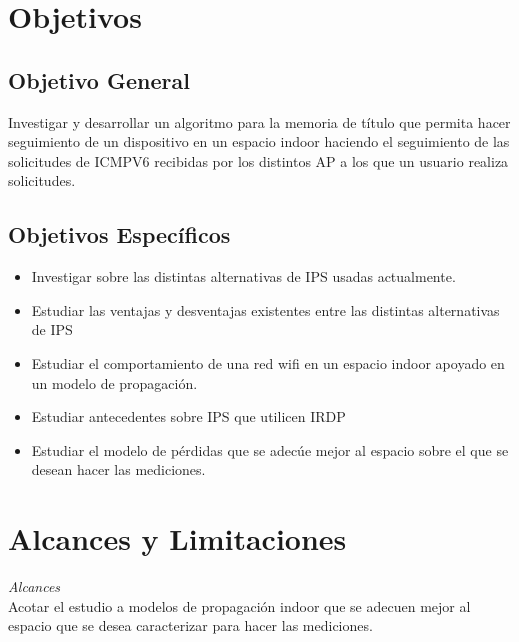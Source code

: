 \section{Objetivos}
\subsection{Objetivo General}

Investigar y desarrollar un algoritmo para la memoria de título que permita hacer seguimiento de un dispositivo en un espacio indoor haciendo el seguimiento de las solicitudes de ICMPV6 recibidas por los distintos AP a los que un usuario realiza solicitudes.

\subsection{Objetivos Específicos}
\begin{itemize}
 \item {Investigar sobre las distintas alternativas de \ac{IPS} usadas actualmente.}
\item{Estudiar las ventajas y desventajas existentes entre las distintas alternativas de \ac{IPS}}
\item{Estudiar el comportamiento de una red wifi en un espacio indoor apoyado en un modelo de propagación.}
\item{Estudiar antecedentes sobre IPS que utilicen \ac{IRDP}}
 \item {Estudiar el modelo de pérdidas que se adecúe mejor al espacio sobre el que se desean hacer las mediciones.}
\end{itemize}

\section{Alcances y Limitaciones}
\textit{Alcances}\\

Acotar el estudio a modelos de propagación indoor que se adecuen mejor al espacio que se desea caracterizar para hacer las mediciones.\\


